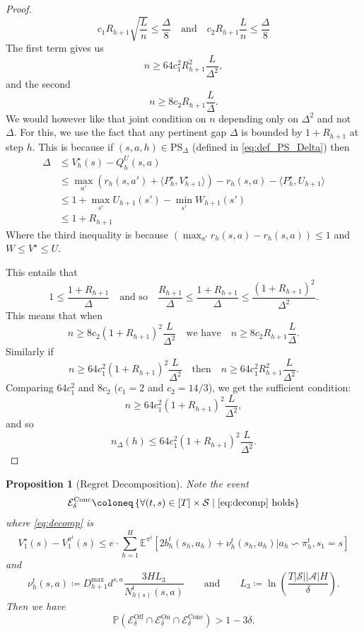 \documentclass[twoside]{article}
\newtheorem{proposition}{Proposition}
\newcommand{\PS}{\mathrm{PS}_{\Delta}} %
\newcommand{\lowv}{W} %
\newcommand{\highv}{U} %
\begin{document}
\begin{proof}
\[c_1R_{h+1}\sqrt{\frac{L}{n}} \leq \dfrac{\Delta}{8} \quad \text{and} \quad c_2 R_{h+1}\frac{L}{n} \le \frac{\Delta}{8}\]
The first term gives us
\[n \geq 64 c_1^2 R_{h+1}^2 \dfrac{L}{\Delta^2},\]
and the second 
\[n \geq 8 c_2 R_{h+1} \dfrac{L}{\Delta}.\]
We would however like that joint condition on $n$ depending only on $\Delta^2$ and not $\Delta$. For this, we use the fact that any pertinent gap $\Delta$ is bounded by $1 + R_{h+1}$ at step $h$. This is because if $(s,a,h)\in\PS$ (defined in \eqref{eq:def_PS_Delta}) then
\begin{align*}
    \Delta & \leq V^\star_h(s) - Q^{\highv}_h(s,a) \\
            & \leq \max_{a'} \left ( r_h(s,a') + \langle P^\star_h, V^\star_{h+1} \rangle \right ) - r_h(s,a) - \langle P^\star_h, \highv_{h+1} \rangle \\
            & \leq 1 + \max_{s'} \highv_{h+1}(s') - \min_{s'}\lowv_{h+1}(s') \\
            & \leq 1 + R_{h+1}
\end{align*}
Where the third inequality is because $(\max_{a'} r_h(s,a) - r_h(s,a)) \leq 1$ and $\lowv \leq V^\star \leq \highv$.

This entails that 
\[ 1\leq \dfrac{1 + R_{h+1}}{\Delta} \quad \text{and so} \quad \dfrac{R_{h+1}}{\Delta} \leq \dfrac{1 + R_{h+1}}{\Delta} \leq \dfrac{(1 + R_{h+1})^2}{\Delta^2}.\]
This means that when 
\[n \geq 8c_2(1+R_{h+1})^2\dfrac{L}{\Delta^2} \quad \text{we have} \quad n \geq 8c_2R_{h+1}\dfrac{L}{\Delta}.\]
Similarly if
\[
n \geq 64 c_1^2 (1+R_{h+1})^2 \dfrac{L}{\Delta^2} \quad \text{then} \quad n \geq 64 c_1^2 R_{h+1}^2 \dfrac{L}{\Delta^2}.
\]
Comparing $64c_{1}^2$ and $8c_2$ ($c_1 = 2$ and $c_2 = 14/3$), we get the sufficient condition: 
\[n \geq 64 c_1^2 (1+R_{h+1})^2 \dfrac{L}{\Delta^2},\]
and so 
\[
n_{\Delta}(h) \leq 64 c_1^2 (1+R_{h+1})^2 \dfrac{L}{\Delta^2}. 
\]
\end{proof}
\noindent
\begin{proposition}[Regret Decomposition]
\label{prop:regret_decomp}
Note the event 
\[\mathcal{E}^{\mathrm{Conc}}_\delta \coloneq \left \lbrace \forall (t,s) \in [T] \times \mathcal{S} \mid \eqref{eq:decomp} ~\mathrm{holds}\right \rbrace \]
where \eqref{eq:decomp} is
\begin{equation}
\label{eq:decomp}
V^\star_{1}(s)-V^{\pi^t}_{1}(s)
 \le e\cdot
\sum_{h=1}^{H}\mathbb{E}^{\pi^t} \left[2b_h^t(s_h,a_h) + \nu_h^t(s_h,a_h) \Big| a_h \backsim \pi^t_h, s_{1}=s\right]
\end{equation}
and
\[
\nu_h^t(s,a) \coloneq D_{h+1}^{\max} d^{s,a}
    \frac{3 H L_3}
    {N_{h(s)}^t(s,a)} \qquad \text{and} \qquad L_3 \coloneq \ln\left( \dfrac{T|\mathcal{S}||\mathcal{A}|H}{\delta} \right).
\]
Then we have 
\[ \mathbb{P} \left (\mathcal{E}^{\mathrm{Off}}_\delta\cap \mathcal{E}^{\mathrm{On}}_\delta \cap \mathcal{E}^{\mathrm{Conc}}_\delta \right ) > 1- 3\delta.\]
\end{proposition}
\end{document}
